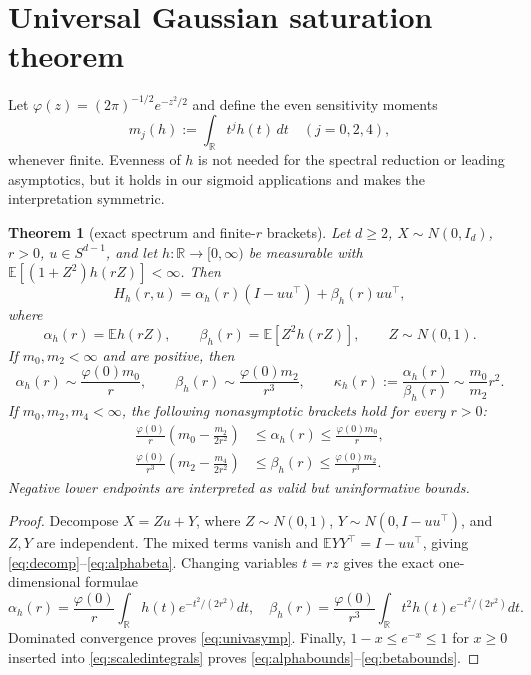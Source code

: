 \documentclass[11pt]{article}
\newtheorem{theorem}{Theorem}[section]
\newcommand{\E}{\mathbb E}
\newcommand{\R}{\mathbb R}
\begin{document}
\section{Universal Gaussian saturation theorem}

Let $\varphi(z)=(2\pi)^{-1/2}e^{-z^2/2}$ and define the even sensitivity moments
\[
 m_j(h):=\int_{\R} t^j h(t)\,dt\quad(j=0,2,4),
\]
whenever finite.  Evenness of $h$ is not needed for the spectral reduction or leading asymptotics, but it holds in
our sigmoid applications and makes the interpretation symmetric.

\begin{theorem}[exact spectrum and finite-$r$ brackets]
\label{thm:universal}
Let $d\ge2$, $X\sim N(0,I_d)$, $r>0$, $u\in S^{d-1}$, and let $h:\R\to[0,\infty)$ be measurable with
$\E[(1+Z^2)h(rZ)]<\infty$.  Then
\begin{equation}
 H_h(r,u)=\alpha_h(r)(I-uu^\top)+\beta_h(r)uu^\top,
 \label{eq:decomp}
\end{equation}
where
\begin{equation}
 \alpha_h(r)=\E h(rZ),\qquad \beta_h(r)=\E[Z^2h(rZ)],\qquad Z\sim N(0,1).
 \label{eq:alphabeta}
\end{equation}
If $m_0,m_2<\infty$ and are positive, then
\begin{equation}
 \alpha_h(r)\sim\frac{\varphi(0)m_0}{r},\qquad
 \beta_h(r)\sim\frac{\varphi(0)m_2}{r^3},\qquad
 \kappa_h(r):=\frac{\alpha_h(r)}{\beta_h(r)}\sim\frac{m_0}{m_2}r^2.
 \label{eq:univasymp}
\end{equation}
If $m_0,m_2,m_4<\infty$, the following nonasymptotic brackets hold for every $r>0$:
\begin{align}
 \frac{\varphi(0)}r\left(m_0-\frac{m_2}{2r^2}\right)
 &\le \alpha_h(r)\le \frac{\varphi(0)m_0}{r},\label{eq:alphabounds}\\
 \frac{\varphi(0)}{r^3}\left(m_2-\frac{m_4}{2r^2}\right)
 &\le \beta_h(r)\le \frac{\varphi(0)m_2}{r^3}.
 \label{eq:betabounds}
\end{align}
Negative lower endpoints are interpreted as valid but uninformative bounds.
\end{theorem}

\begin{proof}
Decompose $X=Zu+Y$, where $Z\sim N(0,1)$, $Y\sim N(0,I-uu^\top)$, and $Z,Y$ are independent.
The mixed terms vanish and $\E YY^\top=I-uu^\top$, giving \eqref{eq:decomp}--\eqref{eq:alphabeta}.
Changing variables $t=rz$ gives the exact one-dimensional formulae
\begin{equation}
 \alpha_h(r)=\frac{\varphi(0)}r\int_\R h(t)e^{-t^2/(2r^2)}dt,
 \quad
 \beta_h(r)=\frac{\varphi(0)}{r^3}\int_\R t^2h(t)e^{-t^2/(2r^2)}dt.
 \label{eq:scaledintegrals}
\end{equation}
Dominated convergence proves \eqref{eq:univasymp}.  Finally,
$1-x\le e^{-x}\le1$ for $x\ge0$ inserted into \eqref{eq:scaledintegrals} proves
\eqref{eq:alphabounds}--\eqref{eq:betabounds}.
\end{proof}
\end{document}
